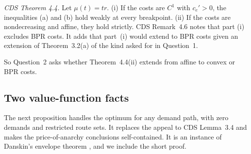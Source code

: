 \emph{CDS Theorem 4.4.} Let $\mu(t)=tr$. (i) If the costs are $C^1$ with $c_e'>0$, the inequalities (a) and (b) hold weakly at every breakpoint. (ii) If the costs are nondecreasing and affine, they hold strictly. CDS Remark~4.6 notes that part (i) excludes BPR costs. It adds that part~(i) would extend to BPR costs given an extension of Theorem~3.2(a) of the kind asked for in Question~1.

So Question~2 asks whether Theorem~4.4(ii) extends from affine to convex or BPR costs.

\subsection{Two value-function facts}

The next proposition handles the optimum for any demand path, with zero demands and restricted route sets. It replaces the appeal to CDS Lemma~3.4 and makes the price-of-anarchy conclusions self-contained. It is an instance of Danskin's envelope theorem \cite{Danskin1966}, and we include the short proof.


